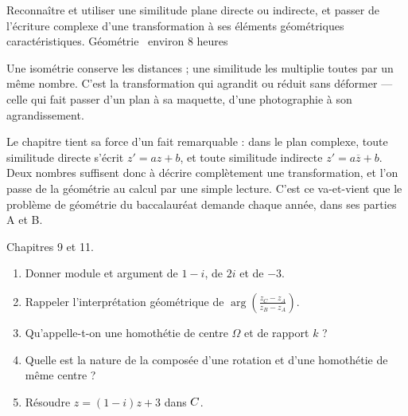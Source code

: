   {Reconnaître et utiliser une similitude plane directe ou indirecte, et
   passer de l'écriture complexe d'une transformation à ses éléments
   géométriques caractéristiques.}
  {Géométrie \textbullet\ environ 8 heures}

Une isométrie conserve les distances ; une similitude les multiplie toutes par
un même nombre. C'est la transformation qui agrandit ou réduit sans déformer
— celle qui fait passer d'un plan à sa maquette, d'une photographie à son
agrandissement.

Le chapitre tient sa force d'un fait remarquable : dans le plan complexe,
toute similitude directe s'écrit $z' = az+b$, et toute similitude indirecte
$z' = a\overline z+b$. Deux nombres suffisent donc à décrire complètement une
transformation, et l'on passe de la géométrie au calcul par une simple
lecture. C'est ce va-et-vient que le problème de géométrie du baccalauréat
demande chaque année, dans ses parties A et B.

\begin{revision}
Chapitres 9 et 11.

\begin{enumerate}[label=\textbf{\arabic*.}, leftmargin=*, itemsep=0.35em]
  \item Donner module et argument de $1-i$, de $2i$ et de $-3$.
  \item Rappeler l'interprétation géométrique de
        $\arg\!\left(\frac{z_{C}-z_{A}}{z_{B}-z_{A}}\right)$.
  \item Qu'appelle-t-on une homothétie de centre $\Omega$ et de rapport $k$ ?
  \item Quelle est la nature de la composée d'une rotation et d'une
        homothétie de même centre ?
  \item Résoudre $z = (1-i)z+3$ dans $C$.
\end{enumerate}
\end{revision}

